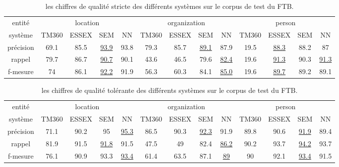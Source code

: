 \documentclass[PhD-Yoann-Dupont.tex]{subfiles}
\begin{document}
\begin{table}[ht!]
\centering
\scriptsize
\begin{tabular}{|c|cccc|cccc|cccc|}
\hline
entité    & \multicolumn{4}{c|}{location}           & \multicolumn{4}{c|}{organization}                   & \multicolumn{4}{c|}{person} \\
système   & TM360 & ESSEX & SEM              & NN   & TM360 & ESSEX & SEM              & NN               & TM360 & ESSEX           & SEM & NN\\
\hline
précision & 69.1  & 85.5  & \underline{93.9} & 93.8 & 79.3  & 85.7  & \underline{89.1} & 87.9             & 19.5 & \underline{88.3} & 88.2 & 87 \\
rappel    & 79.7  & 86.7  & \underline{90.7} & 90.1 & 43.6  & 46.5  & 79.6             & \underline{82.4} & 19.6 & \underline{91.3} & 90.3 & \underline{91.3} \\
f-mesure  & 74    & 86.1  & \underline{92.2} & 91.9 & 56.3  & 60.3  & 84.1             & \underline{85.0} & 19.6 & \underline{89.7} & 89.2 & 89.1 \\
\hline
\end{tabular}
\caption{les chiffres de qualité stricte des différents systèmes sur le corpus de test du FTB.}
\label{tab:FTB6-TM-ESSEX-CRF-LSTM-strict}
\end{table}

\begin{table}[ht!]
\centering
\scriptsize
\begin{tabular}{|c|cccc|cccc|cccc|}
\hline
entité    & \multicolumn{4}{c|}{location}                        & \multicolumn{4}{c|}{organization}                   & \multicolumn{4}{c|}{person} \\
système   & TM360 &  ESSEX & SEM              & NN               & TM360 & ESSEX & SEM              & NN               & TM360 & ESSEX & SEM              & NN \\
\hline
précision & 71.1  & 90.2   & 95               & \underline{95.3} & 86.5  & 90.3  & \underline{92.3} & 91.9             & 89.8 & 90.6   & \underline{91.9} & 89.4 \\
rappel    & 81.9  & 91.5   & \underline{91.8} & 91.5             & 47.5  & 49    & 82.4             & \underline{86.2} & 90.2 & 93.7   & \underline{94.2} & 93.7 \\
f-mesure  & 76.1  & 90.9   & 93.3             & \underline{93.4} & 61.4  & 63.5  & 87.1             & \underline{89}   & 90   & 92.1   & \underline{93.4} & 91.5 \\
\hline
\end{tabular}
\caption{les chiffres de qualité tolérante des différents systèmes sur le corpus de test du FTB.}
\label{tab:FTB6-TM-ESSEX-CRF-LSTM-tolerant}
\end{table}
\end{document}
